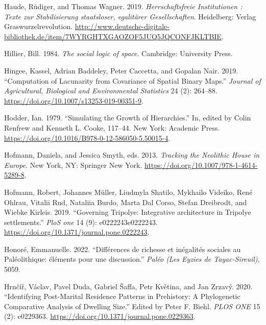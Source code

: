 \documentclass[
  12pt,
  a4paper, twoside]{book}
\newlength{\cslhangindent}
\newlength{\cslentryspacingunit} %
\newenvironment{CSLReferences}[2] %
 {%
  \setlength{\parindent}{0pt}
  \ifodd #1
  \let\oldpar\par
  \def\par{\hangindent=\cslhangindent\oldpar}
  \fi
  \setlength{\parskip}{#2\cslentryspacingunit}
 }%
 {}
\begin{document}
\begin{CSLReferences}{1}{0}
\leavevmode{}%
Haude, Rüdiger, and Thomas Wagner. 2019. \emph{Herrschaftsfreie Institutionen : Texte zur Stabilisierung staatsloser, egalitärer Gesellschaften}. Heidelberg: Verlag Graswurzelrevolution. \url{http://www.deutsche-digitale-bibliothek.de/item/7WYRGHTXGAOZOF5JUQ5JQCONFJKLTBIE}.

\leavevmode{}%
Hillier, Bill. 1984. \emph{The social logic of space}. Cambridge: University Press.

\leavevmode{}%
Hingee, Kassel, Adrian Baddeley, Peter Caccetta, and Gopalan Nair. 2019. {``Computation of Lacunarity from Covariance of Spatial Binary Maps.''} \emph{Journal of Agricultural, Biological and Environmental Statistics} 24 (2): 264--88. \url{https://doi.org/10.1007/s13253-019-00351-9}.

\leavevmode{}%
Hodder, Ian. 1979. {``Simulating the Growth of Hierarchies.''} In, edited by Colin Renfrew and Kenneth L. Cooke, 117--44. New York: Academic Press. \url{https://doi.org/10.1016/B978-0-12-586050-5.50015-4}.

\leavevmode{}%
Hofmann, Daniela, and Jessica Smyth, eds. 2013. \emph{Tracking the Neolithic House in Europe}. New York, NY: Springer New York. \url{https://doi.org/10.1007/978-1-4614-5289-8}.

\leavevmode{}%
Hofmann, Robert, Johannes Müller, Liudmyla Shatilo, Mykhailo Videiko, René Ohlrau, Vitalii Rud, Nataliia Burdo, Marta Dal Corso, Stefan Dreibrodt, and Wiebke Kirleis. 2019. {``Governing Tripolye: Integrative architecture in Tripolye settlements.''} \emph{PloS one} 14 (9): e0222243e0222243. \url{https://doi.org/10.1371/journal.pone.0222243}.

\leavevmode{}%
Honoré, Emmanuelle. 2022. {``Différences de richesse et inégalités sociales au Paléolithique: éléments pour une discussion.''} \emph{Paléo (Les Eyzies de Tayac-Sireuil)}, 5059.

\leavevmode{}%
Hrnčíř, Václav, Pavel Duda, Gabriel Šaffa, Petr Květina, and Jan Zrzavý. 2020. {``Identifying Post-Marital Residence Patterns in Prehistory: A Phylogenetic Comparative Analysis of Dwelling Size.''} Edited by Peter F. Biehl. \emph{PLOS ONE} 15 (2): e0229363. \url{https://doi.org/10.1371/journal.pone.0229363}.


\end{CSLReferences}
\end{document}
